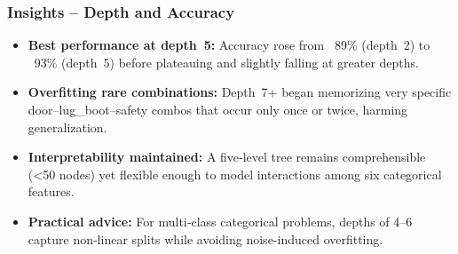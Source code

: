 \subsubsection*{Insights – Depth and Accuracy}
\begin{itemize}
	\item \textbf{Best performance at depth 5:} Accuracy rose from ~89\% (depth 2) to ~93\% (depth 5) before plateauing and slightly falling at greater depths.
	\item \textbf{Overfitting rare combinations:} Depth 7+ began memorizing very specific door–lug\_boot–safety combos that occur only once or twice, harming generalization.
	\item \textbf{Interpretability maintained:} A five‑level tree remains comprehensible (<50 nodes) yet flexible enough to model interactions among six categorical features.
	\item \textbf{Practical advice:} For multi‐class categorical problems, depths of 4–6 capture non‑linear splits while avoiding noise-induced overfitting.
\end{itemize}
